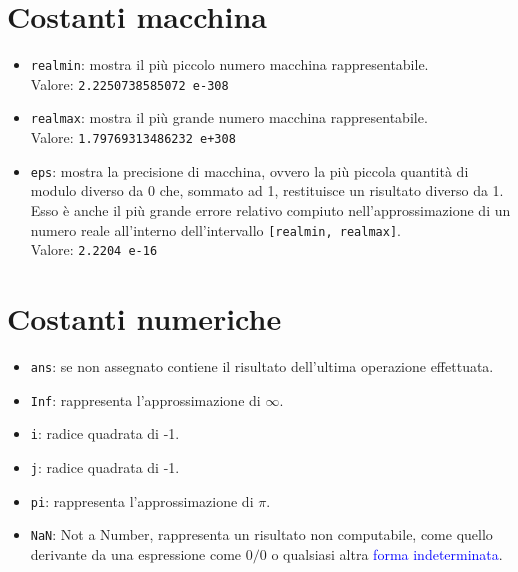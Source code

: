 \section{Costanti macchina}
\begin{itemize}

	\item	\texttt{realmin}: mostra il più piccolo numero macchina rappresentabile. \\
			Valore: \texttt{2.2250738585072 e-308}
	
	\item 	\texttt{realmax}: mostra il più grande numero macchina rappresentabile. \\
			Valore: \texttt{1.79769313486232 e+308}
			
	\item	\texttt{eps}: mostra la precisione di macchina, ovvero la più piccola quantità di modulo diverso da 0
			che, sommato ad 1, restituisce un risultato diverso da 1. Esso è anche il più grande errore relativo
			compiuto nell'approssimazione di un numero reale all'interno dell'intervallo \texttt{[realmin, 
			realmax]}. \\
			Valore: \texttt{2.2204 e-16}

\end{itemize}

\section{Costanti numeriche}
\begin{itemize}

    \item 	\texttt{ans}: se non assegnato contiene il risultato dell'ultima operazione effettuata.
    
    \item 	\texttt{Inf}: rappresenta l'approssimazione di $\infty$.
    
    \item 	\texttt{i}: radice quadrata di -1.
        
    \item 	\texttt{j}: radice quadrata di -1.
    
	\item 	\texttt{pi}: rappresenta l'approssimazione di $\pi$.
			
	\item	\texttt{NaN}: Not a Number, rappresenta un risultato non computabile, come quello derivante da una
			espressione come $0/0$ o qualsiasi altra \textcolor{blue}{forma indeterminata}.
		
\end{itemize}

